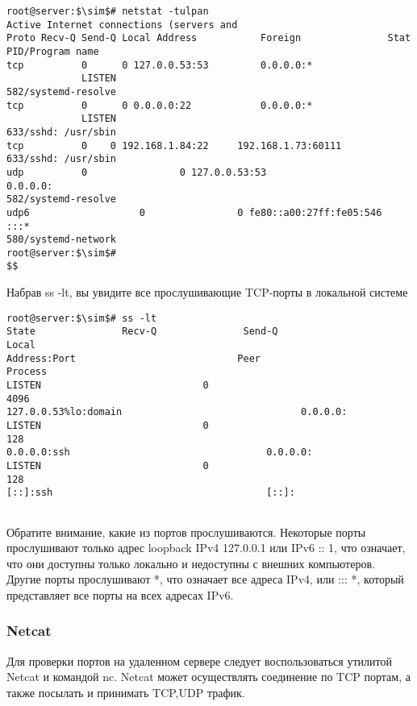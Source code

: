 \documentclass[14pt, a4paper]{article}
\begin{document}
\begin{lstlisting}
root@server:$\sim$# netstat -tulpan
Active Internet connections (servers and
Proto Recv-Q Send-Q Local Address           Foreign               Stat
PID/Program name
tcp          0      0 127.0.0.53:53         0.0.0.0:*
             LISTEN
582/systemd-resolve
tcp          0      0 0.0.0.0:22            0.0.0.0:*
             LISTEN
633/sshd: /usr/sbin
tcp          0    0 192.168.1.84:22     192.168.1.73:60111
633/sshd: /usr/sbin
udp          0                0 127.0.0.53:53                  0.0.0.0:
582/systemd-resolve
udp6                   0                0 fe80::a00:27ff:fe05:546   :::*
580/systemd-network
root@server:$\sim$#
$$
\end{lstlisting}
\vspace{0.2cm}

Набрав \colorbox{backcolour}{ss -lt}, вы увидите все прослушивающие TCP-порты в локальной системе

\vspace{0.3cm}
\begin{lstlisting}
root@server:$\sim$# ss -lt
State               Recv-Q               Send-Q                     Local
Address:Port                            Peer                    Process
LISTEN                            0                                  4096
127.0.0.53%lo:domain                               0.0.0.0:
LISTEN                            0                                   128
0.0.0.0:ssh                                  0.0.0.0:
LISTEN                            0                                   128
[::]:ssh                                     [::]:


\end{lstlisting}
\vspace{0.2cm}

Обратите внимание, какие из портов прослушиваются. Некоторые порты прослушивают только адрес
loopback IPv4 127.0.0.1 или IPv6 :: 1, что означает, что они доступны только локально и недоступны с
внешних компьютеров. Другие порты прослушивают *, что означает все адреса IPv4, или ::: *, который
представляет все порты на всех адресах IPv6.

\subsubsection*{Netcat} 

Для проверки портов на удаленном сервере следует воспользоваться утилитой Netcat и командой nc.
Netcat может осуществлять соединение по TCP портам, а также посылать и принимать TCP,UDP
трафик.\\
\end{document}
